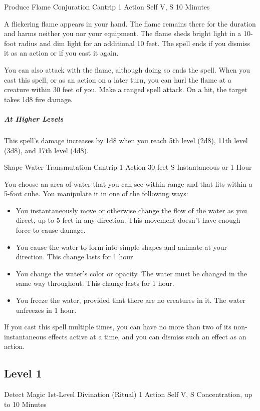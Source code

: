 {\DndSpellHeader
  {Produce Flame}
  {Conjuration Cantrip}
  {1 Action}
  {Self}
  {V, S}
  {10 Minutes}

A flickering flame appears in your hand. The flame remains there for the duration and harms neither you nor your equipment. The flame sheds bright light in a 10-foot radius and dim light for an additional 10 feet. The spell ends if you dismiss it as an action or if you cast it again.

You can also attack with the flame, although doing so ends the spell. When you cast this spell, or as an action on a later turn, you can hurl the flame at a creature within 30 feet of you. Make a ranged spell attack. On a hit, the target takes 1d8 fire damage.

\subparagraph*{At Higher Levels} This spell's damage increases by 1d8 when you reach 5th level (2d8), 11th level (3d8), and 17th level (4d8).

\DndSpellHeader
  {Shape Water}
  {Transmutation Cantrip}
  {1 Action}
  {30 feet}
  {S}
  {Instantaneous or 1 Hour}

You choose an area of water that you can see within range and that fits within a 5-foot cube. You manipulate it in one of the following ways:

\begin{itemize}
	\item You instantaneously move or otherwise change the flow of the water as you direct, up to 5 feet in any direction. This movement doesn’t have enough force to cause damage.
	\item You cause the water to form into simple shapes and animate at your direction. This change lasts for 1 hour.
	\item You change the water’s color or opacity. The water must be changed in the same way throughout. This change lasts for 1 hour.
	\item You freeze the water, provided that there are no creatures in it. The water unfreezes in 1 hour.
\end{itemize}
If you cast this spell multiple times, you can have no more than two of its non-instantaneous effects active at a time, and you can dismiss such an effect as an action.

\subsection*{Level 1}

\DndSpellHeader
  {Detect Magic}
  {1st-Level Divination (Ritual)}
  {1 Action}
  {Self}
  {V, S}
  {Concentration, up to 10 Minutes}

}
